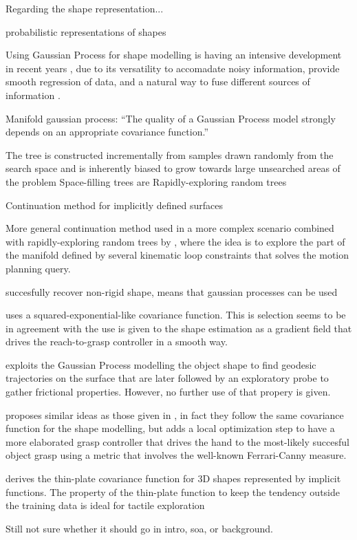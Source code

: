 Regarding the shape representation...

\citet{Faria2010Probabilistic} probabilistic representations of shapes

Using Gaussian Process for shape modelling is having an intensive development in recent years \citep{Mahler2015Grasp,Rosales2014Active,Bjorkman2013Enhancing,Dragiev2011Gaussian}, due to its versatility to accomadate noisy information, provide smooth regression of data, and a natural way to fuse different sources of information \citep{Rasmussen2006Gaussian}.

Manifold gaussian process: \citet{Calandra2014Manifold} ``The quality of a Gaussian Process model strongly depends on an appropriate covariance function.''

The tree is constructed incrementally from samples drawn randomly from the search space and is inherently biased to grow towards large unsearched areas of the problem
Space-filling trees are
Rapidly-exploring random trees \citet{LaValle2011Motion}

Continuation method for implicitly defined surfaces \citet{Henderson1993COMPUTING}

More general continuation method used in a more complex scenario combined with rapidly-exploring random trees \citep{LaValle2011Motion} by \citet{Jaillet2013Path}, where the idea is to explore the part of the manifold defined by several kinematic loop constraints that solves the motion planning query.

\citet{Zhu2009Nonrigid} succesfully recover non-rigid shape, means that gaussian processes can be used

\citet{Dragiev2011Gaussian} uses a squared-exponential-like covariance function. This is selection seems to be in agreement with the use is given to the shape estimation as a gradient field that drives the reach-to-grasp controller in a smooth way.

\citet{Rosales2014Active} exploits the Gaussian Process modelling the object shape to find geodesic trajectories on the surface that are later followed by an exploratory probe to gather frictional properties. However, no further use of that propery is given.

\citet{Mahler2015Grasp} proposes similar ideas as those given in \citet{Dragiev2011Gaussian}, in fact they follow the same covariance function for the shape modelling, but adds a local optimization step to have a more elaborated grasp controller that drives the hand to the most-likely succesful object grasp using a metric that involves the well-known Ferrari-Canny measure.

\citet{Williams2007Gaussian} derives the thin-plate covariance function for 3D shapes represented by implicit functions. The property of the thin-plate function to keep the tendency outside the training data is ideal for tactile exploration~\citep[Fig.~2]{Williams2007Gaussian}

Still not sure whether it should go in intro, soa, or background.
\citet{Li2016Dexterous} 